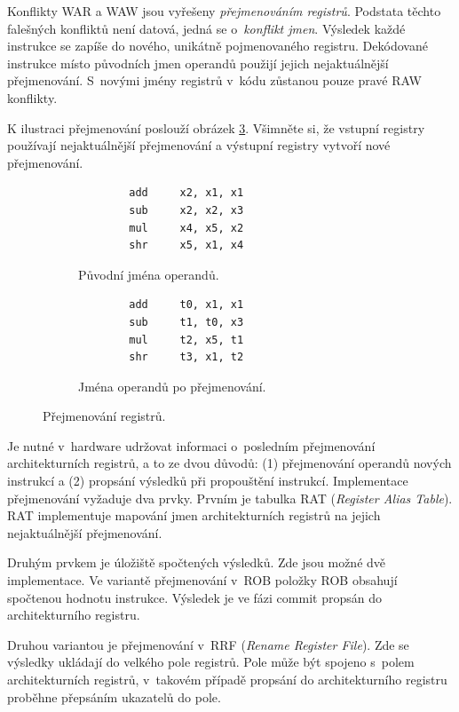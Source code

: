 Konflikty WAR a WAW jsou vyřešeny \emph{přejmenováním registrů}.
Podstata těchto falešných konfliktů není datová, jedná se o~\emph{konflikt jmen}.
Výsledek každé instrukce se zapíše do nového, unikátně pojmenovaného registru.
Dekódované instrukce místo původních jmen operandů použijí jejich nejaktuálnější přejmenování.
S~novými jmény registrů v~kódu zůstanou pouze pravé RAW konflikty.

K ilustraci přejmenování poslouží obrázek \ref{fig:renaming}.
Všimněte si, že vstupní registry používají nejaktuálnější přejmenování a výstupní registry vytvoří nové přejmenování.

\begin{figure}[ht]
     \centering
     \begin{subfigure}[b]{0.4\textwidth}
         \centering
         \begin{lstlisting}
        add     x2, x1, x1 
        sub     x2, x2, x3 
        mul     x4, x5, x2 
        shr     x5, x1, x4 
\end{lstlisting}
         \caption{Původní jména operandů.}
         \label{fig:renaming1}
     \end{subfigure}
     \hfill
     \begin{subfigure}[b]{0.4\textwidth}
         \centering
         \begin{lstlisting}
        add     t0, x1, x1 
        sub     t1, t0, x3 
        mul     t2, x5, t1 
        shr     t3, x1, t2 
\end{lstlisting}
         \caption{Jména operandů po přejmenování.}
         \label{fig:renaming2}
     \end{subfigure}
        \caption{Přejmenování registrů.}
        \label{fig:renaming}
\end{figure}

Je nutné v~hardware udržovat informaci o~posledním přejmenování architekturních registrů, a to ze dvou důvodů: (1) přejmenování operandů nových instrukcí a (2) propsání výsledků při propouštění instrukcí.
Implementace přejmenování vyžaduje dva prvky.
Prvním je tabulka RAT (\emph{Register Alias Table}).
RAT implementuje mapování jmen architekturních registrů na jejich nejaktuálnější přejmenování.

Druhým prvkem je úložiště spočtených výsledků.
Zde jsou možné dvě implementace.
Ve variantě přejmenování v~ROB položky ROB obsahují spočtenou hodnotu instrukce.
Výsledek je ve fázi commit propsán do architekturního registru.

Druhou variantou je přejmenování v~RRF (\emph{Rename Register File}).
Zde se výsledky ukládají do velkého pole registrů.
Pole může být spojeno s~polem architekturních registrů, v~takovém případě propsání do architekturního registru proběhne přepsáním ukazatelů do pole.

